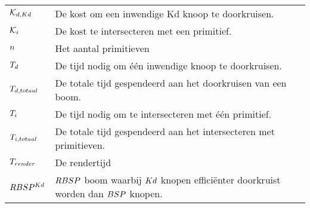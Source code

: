 \documentclass[master=cws,masteroption=mmc,oneside,english]{kulemt}
\begin{document}
\begin{flushleft}
\begin{tabularx}{\textwidth}{@{}p{25mm}X@{}}
    $\mathcal{K}_{d,Kd}$ & De kost om een inwendige Kd knoop te doorkruisen. \\
    $\mathcal{K}_{i}$ & De kost te intersecteren met een primitief. \\
    $n$ & Het aantal primitieven\\
    $T_{d}$ & De tijd nodig om één inwendige knoop te doorkruisen. \\
    $T_{d, totaal}$ & De totale tijd gespendeerd aan het doorkruisen van een boom. \\
    $T_{i}$ & De tijd nodig om te intersecteren met één primitief. \\
    $T_{i, totaal}$ & De totale tijd gespendeerd aan het intersecteren met primitieven. \\
    $T_{render}$ & De rendertijd\\
    $RBSP^{Kd}$ & $RBSP$ boom waarbij $Kd$ knopen efficiënter doorkruist worden dan $BSP$ knopen. \\
  
  \end{tabularx}
\end{flushleft}

\mainmatter








%
%

\backmatter


\end{document}

